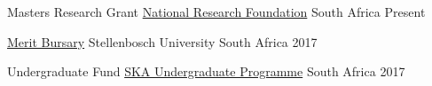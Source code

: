 



\begin{cvhonors}

  \cvhonor
    {Masters Research Grant} %
    {\href{https://www.nrf.ac.za/}{National Research Foundation}} %
    {South Africa} %
    {Present} %

  \cvhonor
    {\href{http://www.sun.ac.za/english/learning-teaching/undergraduate-bursaries-loans/su-funding/merit-bursaries}{Merit Bursary}} %
    {Stellenbosch University} %
    {South Africa} %
    {2017} %

  \cvhonor
    {Undergraduate Fund} %
    {\href{https://www.sarao.ac.za/students/funding/undergraduate-and-honours-bursary-programme/}{SKA
    Undergraduate Programme}} %
    {South Africa} %
    {2017} %

\end{cvhonors}





